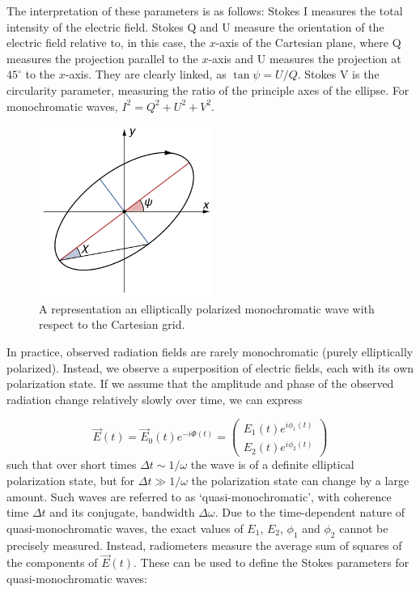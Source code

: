 The interpretation of these parameters is as follows: Stokes I measures the total intensity of the electric field. Stokes Q and U measure the orientation of the electric field relative to, in this case, the $x$-axis of the Cartesian plane, where Q measures the projection parallel to the $x$-axis and U measures the projection at $45^{\circ}$ to the $x$-axis. They are clearly linked, as $\tan\psi = U/Q$. Stokes V is the circularity parameter, measuring the ratio of the principle axes of the ellipse. For monochromatic waves, $I^2 = Q^2 + U^2 + V^2$.

\begin{figure}
\centering
\includegraphics[width=0.5\textwidth]{chapters/astropol/figures/pol_ellipse.png}
\caption{A representation an elliptically polarized monochromatic wave with respect to the Cartesian grid.}
\label{fig:astropol_pol_ellipse}
\end{figure}

In practice, observed radiation fields are rarely monochromatic (purely elliptically polarized). Instead, we observe a superposition of electric fields, each with its own polarization state. If we assume that the amplitude and phase of the observed radiation change relatively slowly over time, we can express 

\begin{equation}
\vec{E}(t) = \vec{E}_0(t)e^{-i\Phi(t)} = \begin{pmatrix}
E_1(t) e^{i\phi_1(t)}\\
E_2(t) e^{i\phi_2(t)}
\end{pmatrix}
\end{equation}
such that over short times $\Delta t \sim 1/\omega$ the wave is of a definite elliptical polarization state, but for $\Delta t \gg 1/\omega$ the polarization state can change by a large amount. Such waves are referred to as `quasi-monochromatic', with coherence time $\Delta t$ and its conjugate, bandwidth $\Delta\omega$. Due to the time-dependent nature of quasi-monochromatic waves, the exact values of $E_1$, $E_2$, $\phi_1$ and $\phi_2$ cannot be precisely measured. Instead, radiometers measure the average sum of squares of the components of $\vec{E}(t)$. These can be used to define the Stokes parameters for quasi-monochromatic waves:

